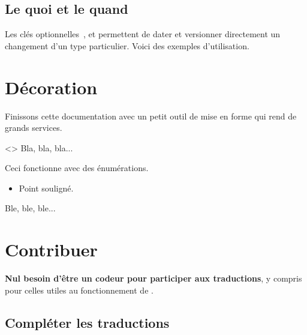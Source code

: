 \subsection{Le quoi et le quand}

Les clés optionnelles \,,  et  permettent de dater et versionner directement un changement d'un type particulier. Voici des exemples d'utilisation.



\section{Décoration}

Finissons cette documentation avec un petit outil de mise en forme qui rend de grands services.


\begin{tdoclatex}<>
Bla, bla, bla...

\tdocsep %

Ceci fonctionne avec des énumérations.

\begin{itemize}
    \item Point souligné.
\end{itemize}

\tdocsep %

Ble, ble, ble...
\end{tdoclatex}


\section{Contribuer}

\begin{tdocnote}
    \textbf{Nul besoin d'être un codeur pour participer aux traductions}, y compris pour celles utiles au fonctionnement de \thisproj.
\end{tdocnote}



\subsection{Compléter les traductions}

